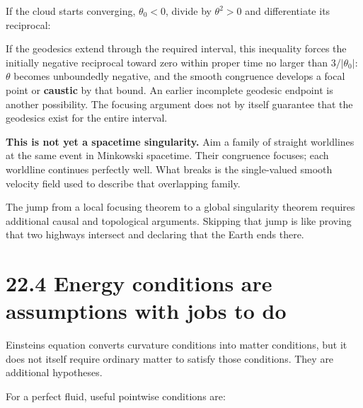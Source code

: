 \documentclass[
  11pt,
  letterpaper,
  oneside,
  openany]{scrbook}
\begin{document}
If the cloud starts converging, \(\theta_0<0\), divide by \(\theta^2>0\)
and differentiate its reciprocal:

\begin{center}
\begingroup
{}
\ifdim\wd\grmathbox>\linewidth
\resizebox{\linewidth}{!}{\usebox{\grmathbox}}
\else\usebox{\grmathbox}\fi
\endgroup
\end{center}

If the geodesics extend through the required interval, this inequality
forces the initially negative reciprocal toward zero within proper time
no larger than \(3/|\theta_0|\): \(\theta\) becomes unboundedly
negative, and the smooth congruence develops a focal point or
\textbf{caustic} by that bound. An earlier incomplete geodesic endpoint
is another possibility. The focusing argument does not by itself
guarantee that the geodesics exist for the entire interval.

\textbf{This is not yet a spacetime singularity.} Aim a family of
straight worldlines at the same event in Minkowski spacetime. Their
congruence focuses; each worldline continues perfectly well. What breaks
is the single-valued smooth velocity field used to describe that
overlapping family.

The jump from a local focusing theorem to a global singularity theorem
requires additional causal and topological arguments. Skipping that jump
is like proving that two highways intersect and declaring that the Earth
ends there.

\hypertarget{energy-conditions-are-assumptions-with-jobs-to-do}{%
\section{22.4 Energy conditions are assumptions with jobs to
do}\label{energy-conditions-are-assumptions-with-jobs-to-do}}

Einstein\textquotesingle s equation converts curvature conditions into
matter conditions, but it does not itself require ordinary matter to
satisfy those conditions. They are additional hypotheses.

For a perfect fluid, useful pointwise conditions are:

\begingroup\small\setlength{\tabcolsep}{5pt}\renewcommand{\arraystretch}{1.13}
\end{document}

